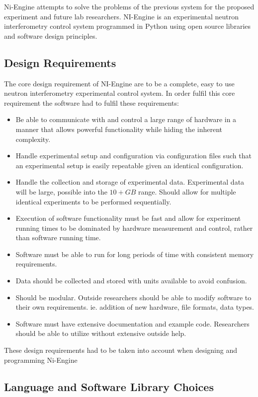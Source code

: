 Ni-Engine attempts to solve the problems of the previous system for the proposed experiment and future lab researchers. NI-Engine is an experimental neutron interferometry control system programmed in Python using open source libraries and software design principles.
\subsection{Design Requirements}
\label{sec:requirements}
The core design requirement of NI-Engine are to be a complete, easy to use neutron interferometry experimental control system. In order fulfil this core requirement the software had to fulfil these requirements: 
\begin{itemize}
  \item Be able to communicate with and control a large range of hardware in a manner that allows powerful functionality while hiding the inherent complexity. 
  \item Handle experimental setup and configuration via configuration files such that an experimental setup is easily repeatable given an identical configuration. 
  \item Handle the collection and storage of experimental data. Experimental data will be large, possible into the $10+GB$ range. Should allow for multiple identical experiments to be performed sequentially.
  \item Execution of software functionality must be fast and allow for experiment running times to be dominated by hardware measurement and control, rather than software running time. 
  \item Software must be able to run for long periods of time with consistent memory requirements.
  \item Data should be collected and stored with units available to avoid confusion.  
  \item Should be modular. Outside researchers should be able to modify software to their own requirements. ie. addition of new hardware, file formats, data types. 
  \item Software must have extensive documentation and example code. Researchers should be able to utilize without extensive outside help.  
\end{itemize}
These design requirements had to be taken into account when designing and programming Ni-Engine
\subsection{Language and Software Library Choices}
